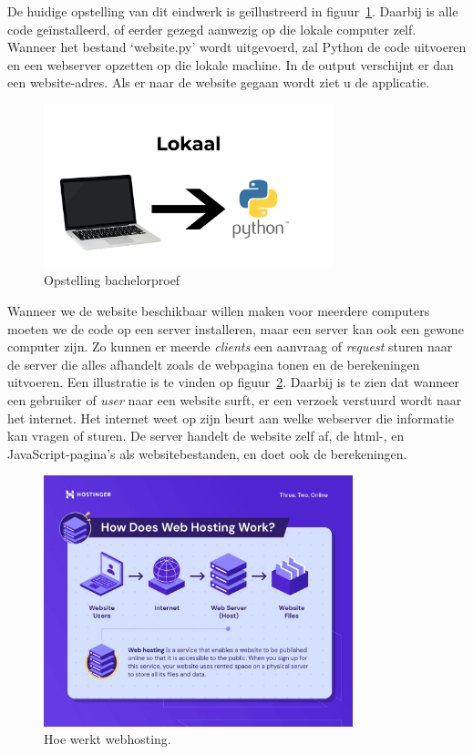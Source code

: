 De huidige opstelling van dit eindwerk is geïllustreerd in figuur~\ref{fig:opstelling_bachelorproef}. Daarbij is alle code geïnstalleerd, of eerder gezegd aanwezig op die lokale computer zelf. Wanneer het bestand `website.py' wordt uitgevoerd, zal Python de code uitvoeren en een webserver opzetten op die lokale machine. In de output verschijnt er dan een website-adres. Als er naar de website gegaan wordt ziet u de applicatie.

\begin{figure}
    \centering
    \includegraphics[width=0.75\textwidth]{./img/lokaal_website}
    \caption{\label{fig:opstelling_bachelorproef} Opstelling bachelorproef}
\end{figure}

Wanneer we de website beschikbaar willen maken voor meerdere computers moeten we de code op een server installeren, maar een server kan ook een gewone computer zijn. Zo kunnen er meerde \textit{clients} een aanvraag of \textit{request} sturen naar de server die alles afhandelt zoals de webpagina tonen en de berekeningen uitvoeren. Een illustratie is te vinden op figuur~\ref{fig:webhosting_scheme}. Daarbij is te zien dat wanneer een gebruiker of \textit{user} naar een website surft, er een verzoek verstuurd wordt naar het internet. Het internet weet op zijn beurt aan welke webserver die informatie kan vragen of sturen. De server handelt de website zelf af, de html-, en JavaScript-pagina's als websitebestanden, en doet ook de berekeningen.

\begin{figure}
    \centering
    \includegraphics[width=0.8\textwidth]{./img/how-does-web-hosting-work}
    \caption{\label{fig:webhosting_scheme} Hoe werkt webhosting.~\autocite{Tamara2022}}
\end{figure}

